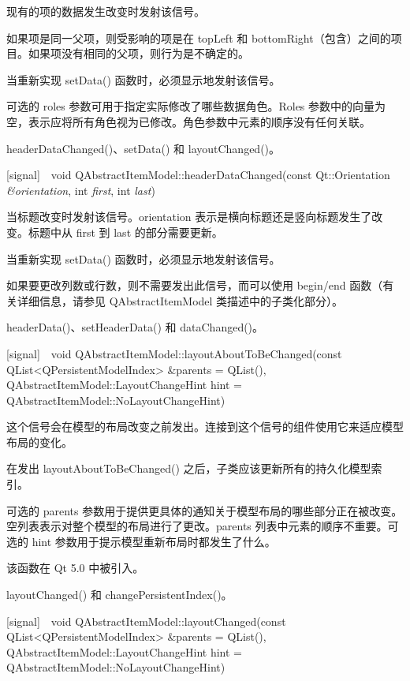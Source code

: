 现有的项的数据发生改变时发射该信号。

如果项是同一父项，则受影响的项是在 topLeft 和 bottomRight（包含）之间的项目。如果项没有相同的父项，则行为是不确定的。

当重新实现 setData() 函数时，必须显示地发射该信号。

可选的 roles 参数可用于指定实际修改了哪些数据角色。Roles 参数中的向量为空，表示应将所有角色视为已修改。角色参数中元素的顺序没有任何关联。

\begin{seeAlso}
headerDataChanged()、setData() 和 layoutChanged()。
\end{seeAlso}

[signal] void QAbstractItemModel::headerDataChanged(const Qt::Orientation \emph{\&orientation}, int \emph{first}, int \emph{last})

当标题改变时发射该信号。orientation 表示是横向标题还是竖向标题发生了改变。标题中从 first 到 last 的部分需要更新。

当重新实现 setData() 函数时，必须显示地发射该信号。

如果要更改列数或行数，则不需要发出此信号，而可以使用 begin/end 函数（有关详细信息，请参见 QAbstractItemModel 类描述中的子类化部分）。

\begin{seeAlso}
headerData()、setHeaderData() 和 dataChanged()。
\end{seeAlso}

[signal] void QAbstractItemModel::layoutAboutToBeChanged(const QList<QPersistentModelIndex> \&parents = QList(), QAbstractItemModel::LayoutChangeHint hint = QAbstractItemModel::NoLayoutChangeHint)

这个信号会在模型的布局改变之前发出。连接到这个信号的组件使用它来适应模型布局的变化。

在发出 layoutAboutToBeChanged() 之后，子类应该更新所有的持久化模型索引。

可选的 parents 参数用于提供更具体的通知关于模型布局的哪些部分正在被改变。空列表表示对整个模型的布局进行了更改。parents 列表中元素的顺序不重要。可选的 hint 参数用于提示模型重新布局时都发生了什么。

该函数在 Qt 5.0 中被引入。

\begin{seeAlso}
layoutChanged() 和 changePersistentIndex()。
\end{seeAlso}

[signal] void QAbstractItemModel::layoutChanged(const QList<QPersistentModelIndex> \&parents = QList(), QAbstractItemModel::LayoutChangeHint hint = QAbstractItemModel::NoLayoutChangeHint)

